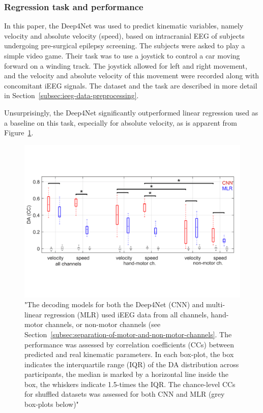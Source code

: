 \subsubsection{Regression task and performance}
In this paper, the Deep4Net was used to predict kinematic variables, namely velocity and absolute velocity (speed), based on intracranial EEG of subjects undergoing pre-surgical epilepsy screening.
The subjects were asked to play a simple video game.
Their task was to use a joystick to control a car moving forward on a winding track.
The joystick allowed for left and right movement, and the velocity and absolute velocity of this movement were recorded along with concomitant iEEG signals. 
The dataset and the task are described in more detail in Section~\ref{subsec:ieeg-data-preprocessing}.

Unsurprisingly, the Deep4Net significantly outperformed linear regression used as a baseline on this task, especially for absolute velocity, as is apparent from Figure~\ref{fig:hammer-performance}.


\begin{figure}[!htpb]
\centering
   \includegraphics[width=0.8\linewidth]{img/ch2/hammer-decoding-acc}
   \caption[Orignial Deep4Net performance]{"The decoding models for both the Deep4Net (CNN) and multi-linear regression (MLR) used iEEG data from all channels, hand-motor channels, or non-motor channels (see Section~\ref{subsec:separation-of-motor-and-non-motor-channels}.
   The performance was assessed by correlation coefficients (CCs) between predicted and real kinematic parameters.
   In each box-plot, the box indicates the interquartile range (IQR) of the DA distribution across participants, the median is marked by a horizontal line inside the box, the whiskers indicate 1.5-times the IQR.
   The chance-level CCs for shuffled datasets was assessed for both CNN and MLR (grey box-plots below)"~\cite{Hammer-2021}}
    \label{fig:hammer-performance}
\end{figure}

